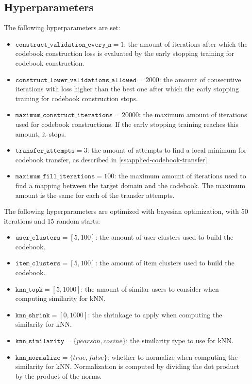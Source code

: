 \subsection{Hyperparameters}

The following hyperparameters are set:
\begin{itemize}
\item $\texttt{construct\_validation\_every\_n} = 1$: the amount of iterations after which the codebook construction loss is evaluated by the early stopping training for codebook construction.
\item $\texttt{construct\_lower\_validations\_allowed} = 2000$: the amount of consecutive iterations with loss higher than the best one after which the early stopping training for codebook construction stops.
\item $\texttt{maximum\_construct\_iterations} = 20000$: the maximum amount of iterations used for codebook constructions. If the early stopping training reaches this amount, it stops.
\item $\texttt{transfer\_attempts} = 3$: the amount of attempts to find a local minimum for codebook transfer, as described in \autoref{ss:applied-codebook-transfer}.
\item $\texttt{maximum\_fill\_iterations} = 100$: the maximum amount of iterations used to find a mapping between the target domain and the codebook. The maximum amount is the same for each of the transfer attempts.
\end{itemize}
The following hyperparameters are optimized with bayesian optimization, with 50 iterations and 15 random starts:
\begin{itemize}
\item $\texttt{user\_clusters} = [5,100]$: the amount of user clusters used to build the codebook.
\item $\texttt{item\_clusters} = [5,100]$: the amount of item clusters used to build the codebook.
\item $\texttt{knn\_topk} = [5,1000]$: the amount of similar users to consider when computing similarity for kNN.
\item $\texttt{knn\_shrink} = [0,1000]$: the shrinkage to apply when computing the similarity for kNN.
\item $\texttt{knn\_similarity} = \{pearson,cosine\}$: the similarity type to use for kNN.
\item $\texttt{knn\_normalize} = \{true,false\}$: whether to normalize when computing the similarity for kNN. Normalization is computed by dividing the dot product by the product of the norms.
\end{itemize}


